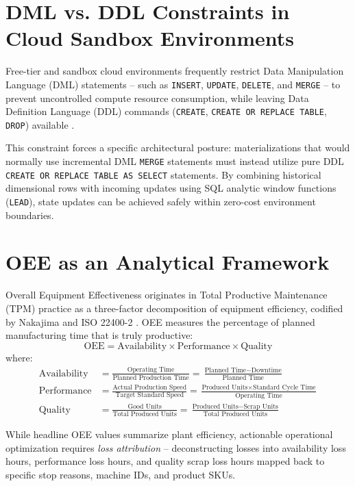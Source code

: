 \documentclass[12pt, a4paper]{report}
\begin{document}
\section{DML vs. DDL Constraints in Cloud Sandbox Environments}
Free-tier and sandbox cloud environments frequently restrict Data Manipulation Language (DML) statements -- such as \texttt{INSERT}, \texttt{UPDATE}, \texttt{DELETE}, and \texttt{MERGE} -- to prevent uncontrolled compute resource consumption, while leaving Data Definition Language (DDL) commands (\texttt{CREATE}, \texttt{CREATE OR REPLACE TABLE}, \texttt{DROP}) available \cite{google_bq_dml_pricing}.

This constraint forces a specific architectural posture: materializations that would normally use incremental DML \texttt{MERGE} statements must instead utilize pure DDL \texttt{CREATE OR REPLACE TABLE AS SELECT} statements. By combining historical dimensional rows with incoming updates using SQL analytic window functions (\texttt{LEAD}), state updates can be achieved safely within zero-cost environment boundaries.

\section{OEE as an Analytical Framework}
Overall Equipment Effectiveness originates in Total Productive Maintenance (TPM) practice as a three-factor decomposition of equipment efficiency, codified by Nakajima \cite{nakajima_tpm} and ISO 22400-2 \cite{iso_22400}. OEE measures the percentage of planned manufacturing time that is truly productive:
\begin{equation}
    \text{OEE} = \text{Availability} \times \text{Performance} \times \text{Quality}
\end{equation}
where:
\begin{align}
    \text{Availability} &= \frac{\text{Operating Time}}{\text{Planned Production Time}} = \frac{\text{Planned Time} - \text{Downtime}}{\text{Planned Time}} \\
    \text{Performance} &= \frac{\text{Actual Production Speed}}{\text{Target Standard Speed}} = \frac{\text{Produced Units} \times \text{Standard Cycle Time}}{\text{Operating Time}} \\
    \text{Quality} &= \frac{\text{Good Units}}{\text{Total Produced Units}} = \frac{\text{Produced Units} - \text{Scrap Units}}{\text{Total Produced Units}}
\end{align}

While headline OEE values summarize plant efficiency, actionable operational optimization requires \emph{loss attribution} -- deconstructing losses into availability loss hours, performance loss hours, and quality scrap loss hours mapped back to specific stop reasons, machine IDs, and product SKUs.
\end{document}
